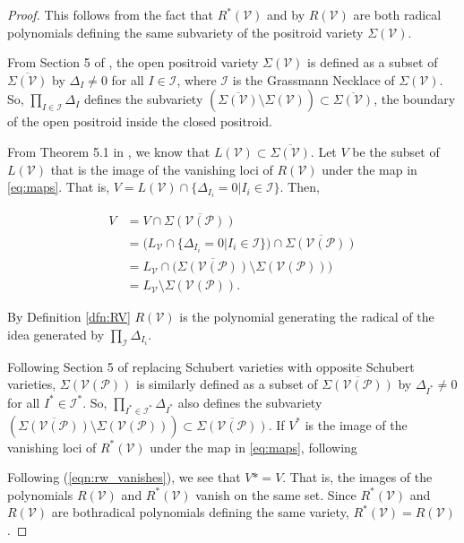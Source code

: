 \documentclass[11pt]{article}
\newcommand{\cP}{\mathcal{P}}
\newcommand{\cV}{\mathcal{V}}
\newcommand{\VP}{\cV(\cP)}
\theoremstyle{remark}
\theoremstyle{definition}
\begin{document}
\begin{proof}
This follows from the fact that $R^{\ast}(\cV)$ and by $R(\cV)$ are both radical polynomials defining the same subvariety of the positroid variety $\Sigma(\cV)$. 

From Section 5 of \cite{knutsonlamspeyerjuggling}, the open positroid variety $\Sigma(\cV)$ is defined as a subset of $\overline{\Sigma(\cV)}$ by $\Delta_I \neq 0$ for all $I \in \mathcal{I}$, where $\mathcal{I}$ is the Grassmann Necklace of $\Sigma(\cV)$. So, $\prod_{I \in \mathcal{I}} \Delta_I$ defines the subvariety $(\overline{\Sigma(\cV)} \setminus \Sigma(\cV)) \subset \overline{\Sigma(\cV)}$, the boundary of the open positroid inside the closed positroid. 

From Theorem 5.1 in \cite{basisshapeloc}, we know that $L(\cV) \subset \overline{\Sigma(\cV)}$. Let $V$ be the subset of $L(\cV)$ that is the image of the vanishing loci of $R(\cV)$ under the map in \eqref{eq:maps}. That is, $V = L(\cV) \cap \{\Delta_{I_i} = 0 | I_i \in \mathcal{I}\}$. Then,

%
\begin{equation} \label{eqn:rw_vanishes}
\begin{split}
V & = V \cap \overline{\Sigma(\VP)} \\
& = \big(L_{\cV} \cap \{\Delta_{I_i} = 0 |  I_i \in \mathcal{I}\}\big) \cap \overline{\Sigma(\VP)} \\
& = L_{\cV} \cap \big(\overline{\Sigma(\VP)} \setminus \Sigma(\VP)\big) \\
& =  L_{\cV} \setminus \Sigma(\VP).
\end{split}
\end{equation}


By Definition \ref{dfn:RV} $R(\cV)$ is the polynomial generating the radical of the idea generated by $\prod_\mathcal{I} \Delta_{I_i}$. 

Following Section 5 of \cite{knutsonlamspeyerjuggling} replacing Schubert varieties with opposite Schubert varieties, $\Sigma(\VP)$ is similarly defined as a subset of $\overline{\Sigma(\VP)}$ by $\Delta_{I^{\ast}} \neq 0$ for all $I^{\ast} \in \mathcal{I}^{\ast}$. So, $\prod_{I^{\ast} \in \mathcal{I}^{\ast}} \Delta_{I^{\ast}}$ also defines the subvariety $(\overline{\Sigma(\VP)} \setminus \Sigma(\VP)) \subset \overline{\Sigma(\VP)}$. If $V^\ast$ is the image of the vanishing loci of $R^\ast(\cV)$ under the map in \eqref{eq:maps}, following

Following (\ref{eqn:rw_vanishes}), we see that $V* = V$. That is, the images of the polynomials $R(\cV)$ and $R^{\ast}(\cV)$ vanish on the same set. Since  $R^{\ast}(\cV)$ and $R(\cV)$ are bothradical polynomials defining the same variety, $R^{\ast}(\cV) = R(\cV)$.
\end{proof} 
\end{document}
